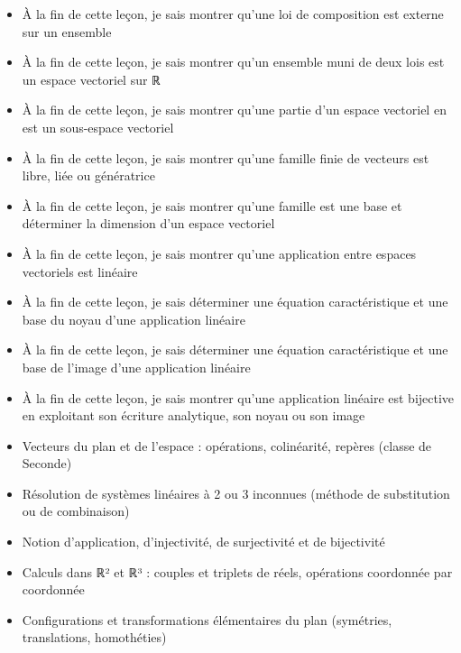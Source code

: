 \documentclass[11pt]{article}
\begin{document}
\begin{objectifs}
\begin{itemize}
\item À la fin de cette leçon, je sais montrer qu'une loi de composition est externe sur un ensemble
\item À la fin de cette leçon, je sais montrer qu'un ensemble muni de deux lois est un espace vectoriel sur ℝ
\item À la fin de cette leçon, je sais montrer qu'une partie d'un espace vectoriel en est un sous-espace vectoriel
\item À la fin de cette leçon, je sais montrer qu'une famille finie de vecteurs est libre, liée ou génératrice
\item À la fin de cette leçon, je sais montrer qu'une famille est une base et déterminer la dimension d'un espace vectoriel
\item À la fin de cette leçon, je sais montrer qu'une application entre espaces vectoriels est linéaire
\item À la fin de cette leçon, je sais déterminer une équation caractéristique et une base du noyau d'une application linéaire
\item À la fin de cette leçon, je sais déterminer une équation caractéristique et une base de l'image d'une application linéaire
\item À la fin de cette leçon, je sais montrer qu'une application linéaire est bijective en exploitant son écriture analytique, son noyau ou son image
\end{itemize}
\end{objectifs}

\begin{prerequis}
\begin{itemize}
\item Vecteurs du plan et de l'espace : opérations, colinéarité, repères (classe de Seconde)
\item Résolution de systèmes linéaires à 2 ou 3 inconnues (méthode de substitution ou de combinaison)
\item Notion d'application, d'injectivité, de surjectivité et de bijectivité
\item Calculs dans ℝ² et ℝ³ : couples et triplets de réels, opérations coordonnée par coordonnée
\item Configurations et transformations élémentaires du plan (symétries, translations, homothéties)
\end{itemize}
\end{prerequis}
\end{document}
